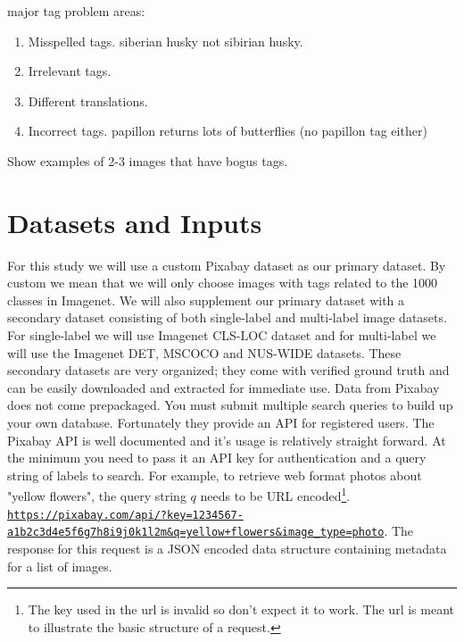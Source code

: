 \documentclass[10pt, a4paper, twocolumn]{article} %
\begin{document}
major tag problem areas:

\begin{enumerate}
	\item Misspelled tags. siberian husky not sibirian husky.
	\item Irrelevant tags.
	\item Different translations.
	\item Incorrect tags. papillon returns lots of butterflies (no papillon tag either)
\end{enumerate}

Show examples of 2-3 images that have bogus tags.


\section{Datasets and Inputs} %

For this study we will use a custom Pixabay dataset as our primary dataset.  By custom we mean that we will only choose images with tags related to the 1000 classes in Imagenet.  We will also supplement our primary dataset with a secondary dataset consisting of both single-label and multi-label image datasets.  For single-label we will use Imagenet CLS-LOC\citep{ILSVRC15} dataset and for multi-label we will use the Imagenet DET\citep{ILSVRC15}, MSCOCO\citep{MSCOCO} and NUS-WIDE\citep{nus-wide-civr09} datasets.  These secondary datasets are very organized; they come with verified ground truth and can be easily downloaded and extracted for immediate use.  Data from Pixabay does not come prepackaged.  You must submit multiple search queries to build up your own database.  Fortunately they provide an API for registered users\citep{Pixabay:API}. The Pixabay API is well documented and it's usage is relatively straight forward.  At the minimum you need to pass it an API key for authentication and a query string of labels to search.  For example, to retrieve web format photos about "yellow flowers", the query string $q$ needs to be URL encoded\footnote{The key used in the url is invalid so don't expect it to work.  The url is meant to illustrate the basic structure of a request.}. \href{}{\nolinkurl{https://pixabay.com/api/?key=1234567-a1b2c3d4e5f6g7h8i9j0k1l2m&q=yellow+flowers&image_type=photo}}. The response for this request is a JSON encoded data structure containing metadata for a list of images.
\end{document}
